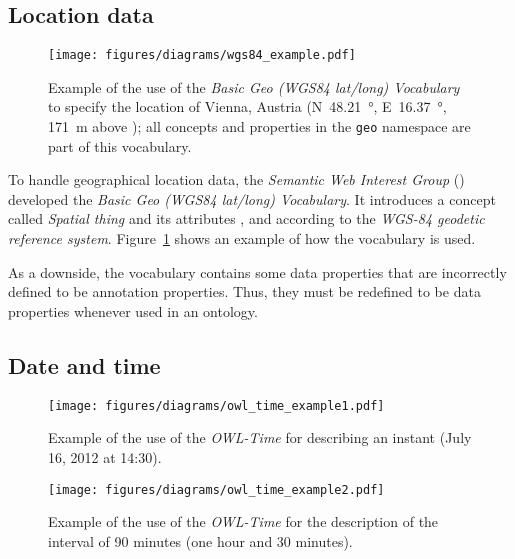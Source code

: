 \subsection{Location data}
\label{subsec:location_ontologies}



\begin{figure}
\centering
\texttt{[image: figures/diagrams/wgs84\_example.pdf]}
\caption{Example of the use of the \emph{Basic Geo (WGS84 lat/long) Vocabulary} to specify the location of Vienna, Austria (N~\SI{48.21}{\degree}, E~\SI{16.37}{\degree}, \SI{171}{\metre} above ); all concepts and properties in the \texttt{geo} namespace are part of this vocabulary.}
\label{fig:wgs84_example}
\end{figure}

To handle geographical location data, the \emph{ Semantic Web Interest Group} () developed the \emph{Basic Geo (WGS84 lat/long) Vocabulary}\cite{wgs84_vocabulary}. It introduces a concept called \emph{Spatial thing} and its attributes ,  and  according to the \emph{WGS-84 geodetic reference system}\cite{WGS84}. Figure~\ref{fig:wgs84_example} shows an example of how the vocabulary is used.

As a downside, the vocabulary contains some data properties that are incorrectly defined to be annotation properties. Thus, they must be redefined to be data properties whenever used in an  ontology.

\subsection{Date and time}
\label{subsec:date_ontologies}

\begin{figure}
\centering
\texttt{[image: figures/diagrams/owl\_time\_example1.pdf]}
\caption{Example of the use of the \emph{OWL-Time} for describing an instant (July 16, 2012 at 14:30).}
\label{fig:owl_time_example1}
\end{figure}

\begin{figure}
\centering
\texttt{[image: figures/diagrams/owl\_time\_example2.pdf]}
\caption{Example of the use of the \emph{OWL-Time} for the description of the interval of 90 minutes (one hour and 30 minutes).}
\label{fig:owl_time_example2}
\end{figure}

